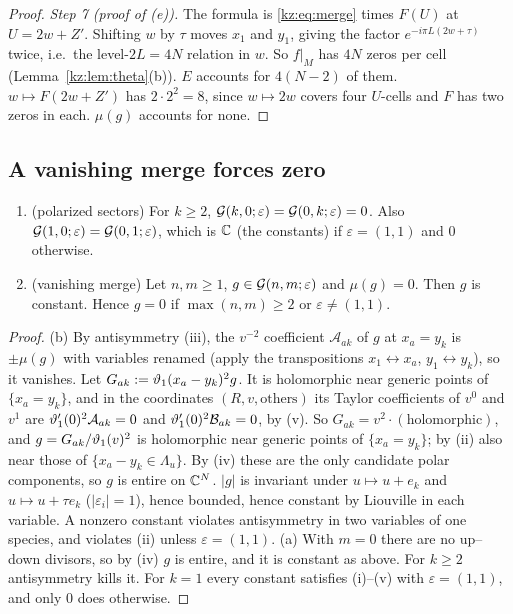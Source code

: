 \begin{proof}
\emph{Step 7 (proof of (e)).} The formula is \eqref{kz:eq:merge} times $F(U)$ at $U=2w+Z'$. Shifting $w$ by $\tau$
moves $x_1$ and $y_1$, giving the factor $e^{-i\pi L(2w+\tau)}$ twice, i.e.\ the level-$2L=4N$ relation in $w$.
So $f|_M$ has $4N$ zeros per cell (Lemma~\ref{kz:lem:theta}(b)). $E$ accounts for $4(N-2)$ of them. $w\mapsto
F(2w+Z')$ has $2\cdot2^2=8$, since $w\mapsto2w$ covers four $U$-cells and $F$ has two zeros in each.
$\mu(g)$ accounts for none.
\end{proof}

\subsection{A vanishing merge forces zero}\label{kz:sec:D}

\begin{lemma}\label{kz:lem:D}
\begin{enumerate}
\item[(a)] \textup{(polarized sectors)} For $k\ge2$, $\mathcal{G}(k,0;\varepsilon)=\mathcal{G}(0,k;\varepsilon)=0$. Also
$\mathcal{G}(1,0;\varepsilon)=\mathcal{G}(0,1;\varepsilon)$, which is $\mathbb{C}$ (the constants) if $\varepsilon=(1,1)$ and $0$ otherwise.
\item[(b)] \textup{(vanishing merge)} Let $n,m\ge1$, $g\in\mathcal{G}(n,m;\varepsilon)$ and $\mu(g)=0$. Then $g$ is constant.
Hence $g=0$ if $\max(n,m)\ge2$ or $\varepsilon\neq(1,1)$.
\end{enumerate}
\end{lemma}

\begin{proof}
(b) By antisymmetry (iii), the $v^{-2}$ coefficient $\mathcal A_{ak}$ of $g$ at $x_a=y_k$ is $\pm\mu(g)$ with
variables renamed (apply the transpositions $x_1\leftrightarrow x_a$, $y_1\leftrightarrow y_k$), so it vanishes. Let
$G_{ak}:=\vartheta_1(x_a-y_k)^2g$. It is holomorphic near generic points of $\{x_a=y_k\}$, and in the coordinates
$(R,v,\text{others})$ its Taylor coefficients of $v^0$ and $v^1$ are $\vartheta_1'(0)^2\mathcal A_{ak}=0$ and
$\vartheta_1'(0)^2\mathcal B_{ak}=0$, by (v). So $G_{ak}=v^2\cdot(\text{holomorphic})$, and $g=G_{ak}/\vartheta_1(v)^2$ is
holomorphic near generic points of $\{x_a=y_k\}$; by (ii) also near those of $\{x_a-y_k\in\Lambda_u\}$. By (iv)
these are the only candidate polar components, so $g$ is entire on $\mathbb{C}^N$. $|g|$ is invariant under
$u\mapsto u+e_k$ and $u\mapsto u+\tau e_k$ ($|\varepsilon_i|=1$), hence bounded, hence constant by Liouville in each
variable. A nonzero constant violates antisymmetry in two variables of one species, and violates (ii) unless
$\varepsilon=(1,1)$.
(a) With $m=0$ there are no up--down divisors, so by (iv) $g$ is entire, and it is constant as above. For
$k\ge2$ antisymmetry kills it. For $k=1$ every constant satisfies (i)--(v) with $\varepsilon=(1,1)$, and only $0$
does otherwise.
\end{proof}

